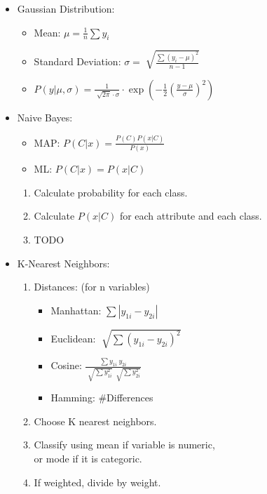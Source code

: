 \documentclass[twocolumn, 10pt]{article}
\begin{document}
\begin{itemize}[leftmargin=*, itemsep=0pt]
    \item Gaussian Distribution:
    \begin{itemize}[topsep=0pt, itemsep=0pt]
        \item Mean: $\displaystyle \mu=\frac{1}{n}\sum y_i$
        \item Standard Deviation: $\displaystyle \sigma=\sqrt[]{\frac{\sum(y_i-\mu)^2}{n-1}}$
        \item $\displaystyle  P(y|\mu,\sigma)=\frac{1}{\sqrt[]{2\pi}\cdot\sigma}\cdot\exp\left(-\frac{1}{2}\left(\frac{y-\mu}{\sigma}\right)^2\right)$
    \end{itemize}

    \newpage
    \item Naive Bayes: 
    \begin{itemize}[topsep=0pt, itemsep=0pt]
        \item MAP: $\displaystyle P(C|x)=\frac{P(C)P(x|C)}{P(x)}$
        \item ML: $\displaystyle P(C|x)=P(x|C)$
    \end{itemize}
    \begin{enumerate}[topsep=0pt, itemsep=0pt]
        \item Calculate probability for each class.
        \item Calculate $P(x|C)$ for each attribute and each class.
        \item TODO
    \end{enumerate}
    
    \item K-Nearest Neighbors:
    \begin{enumerate}[topsep=0pt, itemsep=0pt]
        \item Distances: (for n variables)
        \begin{itemize}[topsep=0pt]
            \item Manhattan: $\displaystyle \sum |y_{1i}-y_{2i}|$
            \item Euclidean: $\displaystyle \sqrt[]{\sum (y_{1i}-y_{2i})^2}$
            \item Cosine: $\displaystyle \frac{\sum y_{1i}\ y_{2i}}
            {\sqrt[]{\sum y_{1i}^2}\ \sqrt[]{\sum y_{2i}^2}}$
            \item Hamming: \#Differences
        \end{itemize}
        \item Choose K nearest neighbors.
        \item Classify using mean if variable is numeric, \\
        or mode if it is categoric.
        \item If weighted, divide by weight.
    \end{enumerate}


\end{itemize}
\end{document}
